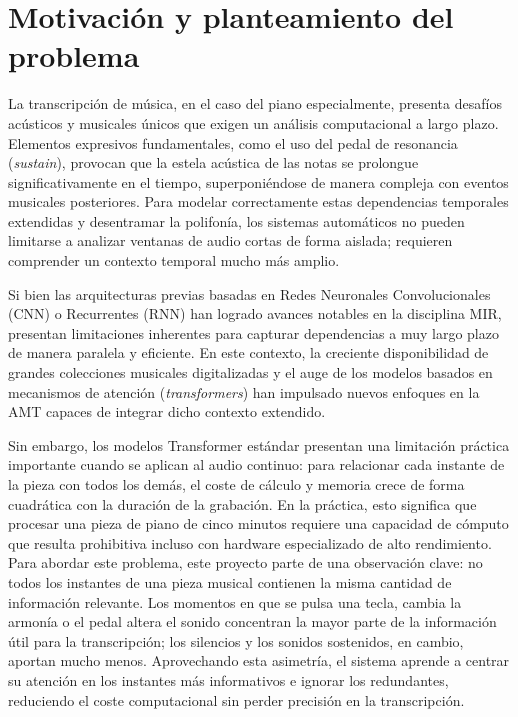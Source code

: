 \section{Motivación y planteamiento del problema}

La transcripción de música, en el caso del piano especialmente, presenta desafíos acústicos y musicales únicos que exigen un análisis computacional a largo plazo. Elementos expresivos fundamentales, como el uso del pedal de resonancia (\textit{sustain}), provocan que la estela acústica de las notas se prolongue significativamente en el tiempo, superponiéndose de manera compleja con eventos musicales posteriores. Para modelar correctamente estas dependencias temporales extendidas y desentramar la polifonía, los sistemas automáticos no pueden limitarse a analizar ventanas de audio cortas de forma aislada; requieren comprender un contexto temporal mucho más amplio.

Si bien las arquitecturas previas basadas en Redes Neuronales Convolucionales (CNN) o Recurrentes (RNN) han logrado avances notables en la disciplina MIR, presentan limitaciones inherentes para capturar dependencias a muy largo plazo de manera paralela y eficiente. En este contexto, la creciente disponibilidad de grandes colecciones musicales digitalizadas y el auge de los modelos basados en mecanismos de atención (\textit{transformers}) han impulsado nuevos enfoques en la AMT capaces de integrar dicho contexto extendido.

Sin embargo, los modelos Transformer estándar presentan una limitación práctica importante cuando se aplican al audio continuo: para relacionar cada instante de la pieza con todos los demás, el coste de cálculo y memoria crece de forma cuadrática con la duración de la grabación. En la práctica, esto significa que procesar una pieza de piano de cinco minutos requiere una capacidad de cómputo que resulta prohibitiva incluso con hardware especializado de alto rendimiento.
\\
Para abordar este problema, este proyecto parte de una observación clave: no todos los instantes de una pieza musical contienen la misma cantidad de información relevante. Los momentos en que se pulsa una tecla, cambia la armonía o el pedal altera el sonido concentran la mayor parte de la información útil para la transcripción; los silencios y los sonidos sostenidos, en cambio, aportan mucho menos. Aprovechando esta asimetría, el sistema aprende a centrar su atención en los instantes más informativos e ignorar los redundantes, reduciendo el coste computacional sin perder precisión en la transcripción.
\\[1,5cm]
